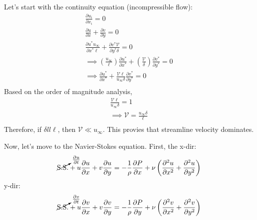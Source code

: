 Let's start with the continuity equation (incompressible flow):
\begin{gather*}
    \frac{\partial u_i}{\partial x_i} = 0 \\
    \frac{\partial u}{\partial x} + \frac{\partial v}{\partial y} = 0 \\
    \frac{\partial u^* u_{\infty}}{\partial x^* \ell} + \frac{\partial v^* \mathcal{V}}{\partial y^* \delta} = 0 \\
    \implies \left(\frac{u_{\infty}}{\ell}\right) \frac{\partial u^*}{\partial x^*} + \left(\frac{\mathcal{V}}{\delta}\right) \frac{\partial v^*}{\partial y^*} = 0 \\
    \implies \frac{\partial u^*}{\partial x^*} +\frac{\mathcal{V} \ell}{u_{\infty} \delta} \frac{\partial v^*}{\partial y^*} = 0 \\
\end{gather*}
Based on the order of magnitude analysis, 
\begin{gather*}
    \frac{\mathcal{V} \ell}{u_{\infty} \delta} = 1 \\
    \implies \mathcal{V} = \frac{u_{\infty} \delta}{\ell} \\
\end{gather*}
Therefore, if $\delta ll \ell$, then $\mathcal{V} \ll u_{\infty}$. This provies that streamline velocity dominates. 

Now, let's move to the Navier-Stokes equation. First, the x-dir:
\begin{gather*}
    \cancelto{\frac{\partial u}{\partial t}}{\text{S.S.}} + u \frac{\partial u}{\partial x} + v \frac{\partial u}{\partial y} = -\frac{1}{\rho} \frac{\partial P}{\partial x} + \nu \left(\frac{\partial^2 u}{\partial x^2} + \frac{\partial^2 u}{\partial y^2}\right) 
\end{gather*}
y-dir:
\begin{gather*}
    \cancelto{\frac{\partial v}{\partial t}}{\text{S.S.}} + u \frac{\partial v}{\partial x} + v \frac{\partial v}{\partial y} = -\frac{1}{\rho} \frac{\partial P}{\partial y} + \nu \left(\frac{\partial^2 v}{\partial x^2} + \frac{\partial^2 v}{\partial y^2}\right)
\end{gather*}

